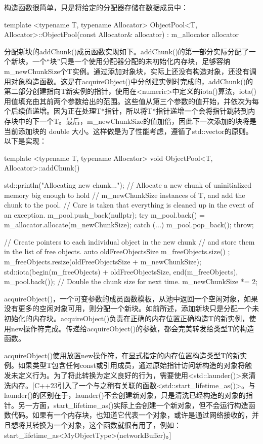 构造函数很简单，只是将给定的分配器存储在数据成员中：

\begin{cpp}
template <typename T, typename Allocator>
ObjectPool<T, Allocator>::ObjectPool(const Allocator& allocator)
    : m_allocator { allocator }
{}
\end{cpp}

分配新块的addChunk()成员函数实现如下。addChunk()的第一部分实际分配了一个新块，一个“块”只是一个使用分配器分配的未初始化内存块，足够容纳m\_newChunkSize个T实例。通过添加对象块，实际上还没有构造对象，还没有调用对象构造函数。这是在acquireObject()中分创建实例时完成的，addChunk()的第二部分创建指向T新实例的指针，使用在<numeric>中定义的iota()算法，iota()用值填充由其前两个参数给出的范围。这些值从第三个参数的值开始，并依次为每个后续值递增。因为正在处理T*指针，所以将T*指针递增一个会将指针跳转到内存块中的下一个T。最后，m\_newChunkSize的值加倍，因此下一次添加的块将是当前添加块的 double 大小。这样做是为了性能考虑，遵循了std::vector的原则。以下是实现：

\begin{cpp}
template <typename T, typename Allocator>
void ObjectPool<T, Allocator>::addChunk()
{
    std::println("Allocating new chunk...");
    // Allocate a new chunk of uninitialized memory big enough to hold
    // m_newChunkSize instances of T, and add the chunk to the pool.
    // Care is taken that everything is cleaned up in the event of an exception.
    m_pool.push_back(nullptr);
    try {
        m_pool.back() = m_allocator.allocate(m_newChunkSize);
    } catch (...) {
        m_pool.pop_back();
        throw;
    }

    // Create pointers to each individual object in the new chunk
    // and store them in the list of free objects.
    auto oldFreeObjectsSize { m_freeObjects.size() };
    m_freeObjects.resize(oldFreeObjectsSize + m_newChunkSize);
    std::iota(begin(m_freeObjects) + oldFreeObjectsSize, end(m_freeObjects),
        m_pool.back());
    // Double the chunk size for next time.
    m_newChunkSize *= 2;
}
\end{cpp}

acquireObject()，一个可变参数的成员函数模板，从池中返回一个空闲对象，如果没有更多的空闲对象可用，则分配一个新块。如前所述，添加新块只是分配一个未初始化的内存块。acquireObject()负责在正确的内存位置正确构造T的新实例，使用new操作符完成。传递给acquireObject()的参数，都会完美转发给类型T的构造函数。

acquireObject()使用放置new操作符，在显式指定的内存位置构造类型T的新实例。如果类型T包含任何const或引用成员，通过原始指针访问新构造的对象将触发未定义行为。为了将此转换为定义良好的行为，需要使用<std::launder()>来清洗内存。[C++23引入了一个与之稍有关联的函数<std::start\_lifetime\_as()>。与launder()的区别在于，launder()不会创建新对象，只是清洗已经构造的对象的指针。另一方面，start\_lifetime\_as()实际上会创建一个新对象，但不会运行构造函数代码。如果有一个内存块，也知道它代表一个对象，或许是通过网络接收的，并且想将其转换为一个对象，这个函数就很有用了，例如：start\_lifetime\_as<MyObjectType>(networkBuffer)。]

